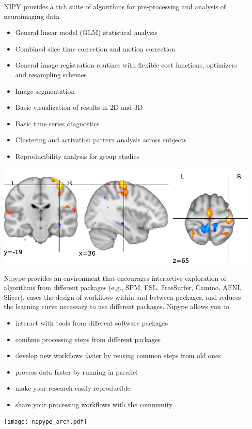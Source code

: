 \begin{multicols}{3}
NIPY provides a rich suite of algorithms for pre-processing and
analysis of neuroimaging data
\begin{itemize}[nolistsep,topsep=0em,leftmargin=1pc]
\item General linear model (GLM) statistical analysis
\item Combined slice time correction and motion correction
\item General image registration routines with flexible cost functions, optimizers
and resampling schemes
\item Image segmentation
\item Basic visualization of results in 2D and 3D
\item Basic time series diagnostics
\item Clustering and activation pattern analysis across subjects
\item Reproducibility analysis for group studies
\end{itemize}
\includegraphics[width=\columnwidth]{../pics/nipy_viz.pdf}



Nipype provides an environment that encourages interactive exploration
of algorithms from different packages (e.g., SPM, FSL, FreeSurfer,
Camino, AFNI, Slicer), eases the design of workflows within and
between packages, and reduces the learning curve necessary to use
different packages.
Nipype allows you to
\begin{itemize}[nolistsep,topsep=0em,leftmargin=1pc]
\item interact with tools from different software packages
\item combine processing steps from different packages
\item develop new workflows faster by reusing common steps from old ones
\item process data faster by running in parallel%
\item make your research easily reproducible
\item share your processing workflows with the community
\end{itemize}
\vspace{-1em}
\texttt{[image: nipype\_arch.pdf]}


\end{multicols}

